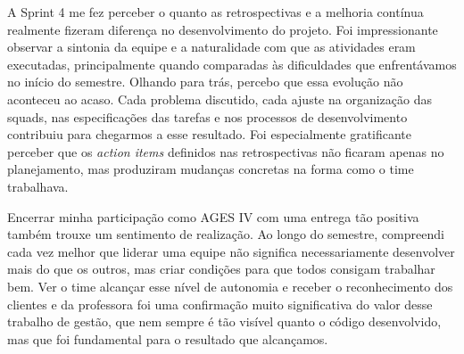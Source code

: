 \begin{reflection}
\noindent A Sprint 4 me fez perceber o quanto as retrospectivas e a melhoria contínua realmente fizeram diferença no desenvolvimento do projeto. Foi impressionante observar a sintonia da equipe e a naturalidade com que as atividades eram executadas, principalmente quando comparadas às dificuldades que enfrentávamos no início do semestre. Olhando para trás, percebo que essa evolução não aconteceu ao acaso. Cada problema discutido, cada ajuste na organização das squads, nas especificações das tarefas e nos processos de desenvolvimento contribuiu para chegarmos a esse resultado. Foi especialmente gratificante perceber que os \textit{action items} definidos nas retrospectivas não ficaram apenas no planejamento, mas produziram mudanças concretas na forma como o time trabalhava.\par

\noindent Encerrar minha participação como AGES IV com uma entrega tão positiva também trouxe um sentimento de realização. Ao longo do semestre, compreendi cada vez melhor que liderar uma equipe não significa necessariamente desenvolver mais do que os outros, mas criar condições para que todos consigam trabalhar bem. Ver o time alcançar esse nível de autonomia e receber o reconhecimento dos clientes e da professora foi uma confirmação muito significativa do valor desse trabalho de gestão, que nem sempre é tão visível quanto o código desenvolvido, mas que foi fundamental para o resultado que alcançamos.\par

\end{reflection}
